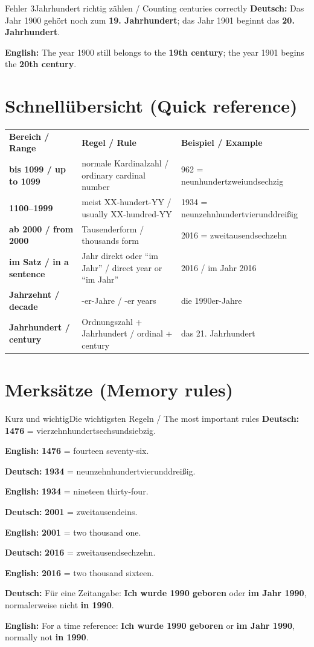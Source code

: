 \documentclass[a4paper,11pt]{article}
\newcommand{\GermanText}[1]{\textbf{Deutsch: }#1\par}
\newcommand{\EnglishText}[1]{{\small\color{SoftGray}\textbf{English: }#1\par}}
\begin{document}
\begin{grammarentry}{Fehler 3}{Jahrhundert richtig zählen / Counting centuries correctly}
\GermanText{Das Jahr 1900 gehört noch zum \textbf{19. Jahrhundert}; das Jahr 1901 beginnt das \textbf{20. Jahrhundert}.}
\EnglishText{The year 1900 still belongs to the \textbf{19th century}; the year 1901 begins the \textbf{20th century}.}
\end{grammarentry}

\section{Schnellübersicht \textnormal{(Quick reference)}}

\begin{longtable}{>{\bfseries}p{4.0cm}|p{5.0cm}|p{5.0cm}}
\rowcolor{HeaderBlueDark}
\color{white}\textbf{Bereich / Range} &
\color{white}\textbf{Regel / Rule} &
\color{white}\textbf{Beispiel / Example} \\
bis 1099 / up to 1099 & normale Kardinalzahl / ordinary cardinal number & 962 = neunhundertzweiundsechzig \\
1100--1999 & meist XX-hundert-YY / usually XX-hundred-YY & 1934 = neunzehnhundertvierunddreißig \\
ab 2000 / from 2000 & Tausenderform / thousands form & 2016 = zweitausendsechzehn \\
im Satz / in a sentence & Jahr direkt oder ``im Jahr'' / direct year or ``im Jahr'' & 2016 / im Jahr 2016 \\
Jahrzehnt / decade & -er-Jahre / -er years & die 1990er-Jahre \\
Jahrhundert / century & Ordnungszahl + Jahrhundert / ordinal + century & das 21. Jahrhundert \\
\end{longtable}

\section{Merksätze \textnormal{(Memory rules)}}

\begin{grammarentry}{Kurz und wichtig}{Die wichtigsten Regeln / The most important rules}
\GermanText{\textbf{1476} = vierzehnhundertsechsundsiebzig.}
\EnglishText{\textbf{1476} = fourteen seventy-six.}

\GermanText{\textbf{1934} = neunzehnhundertvierunddreißig.}
\EnglishText{\textbf{1934} = nineteen thirty-four.}

\GermanText{\textbf{2001} = zweitausendeins.}
\EnglishText{\textbf{2001} = two thousand one.}

\GermanText{\textbf{2016} = zweitausendsechzehn.}
\EnglishText{\textbf{2016} = two thousand sixteen.}

\GermanText{Für eine Zeitangabe: \textbf{Ich wurde 1990 geboren} oder \textbf{im Jahr 1990}, normalerweise nicht \textbf{in 1990}.}
\EnglishText{For a time reference: \textbf{Ich wurde 1990 geboren} or \textbf{im Jahr 1990}, normally not \textbf{in 1990}.}
\end{grammarentry}
\end{document}
